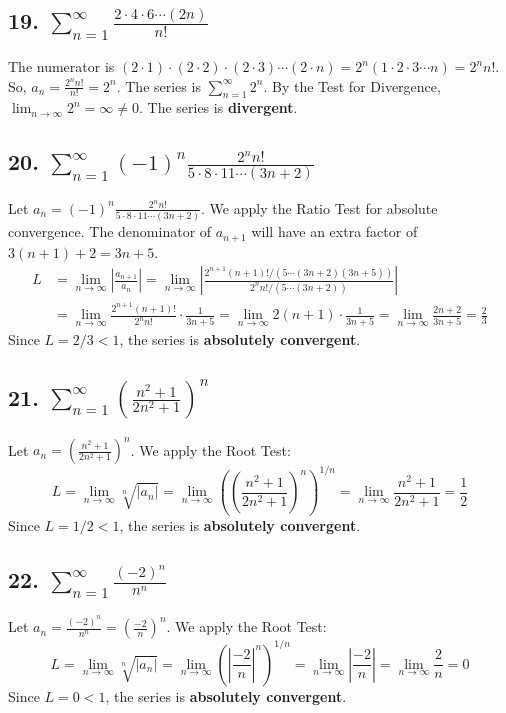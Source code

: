 \documentclass{article}
\begin{document}
\subsection*{19. $\sum_{n=1}^{\infty} \frac{2 \cdot 4 \cdot 6 \cdots (2n)}{n!}$}
The numerator is $(2 \cdot 1) \cdot (2 \cdot 2) \cdot (2 \cdot 3) \cdots (2 \cdot n) = 2^n(1 \cdot 2 \cdot 3 \cdots n) = 2^n n!$.
So, $a_n = \frac{2^n n!}{n!} = 2^n$.
The series is $\sum_{n=1}^{\infty} 2^n$. By the Test for Divergence, $\lim_{n \to \infty} 2^n = \infty \neq 0$.
The series is \textbf{divergent}.

\subsection*{20. $\sum_{n=1}^{\infty} (-1)^n \frac{2^n n!}{5 \cdot 8 \cdot 11 \cdots (3n+2)}$}
Let $a_n = (-1)^n \frac{2^n n!}{5 \cdot 8 \cdot 11 \cdots (3n+2)}$. We apply the Ratio Test for absolute convergence.
The denominator of $a_{n+1}$ will have an extra factor of $3(n+1)+2 = 3n+5$.
\begin{align*}
L &= \lim_{n \to \infty} \left| \frac{a_{n+1}}{a_n} \right| = \lim_{n \to \infty} \left| \frac{2^{n+1}(n+1)!/(5 \cdots (3n+2)(3n+5))}{2^n n!/(5 \cdots (3n+2))} \right| \\
&= \lim_{n \to \infty} \frac{2^{n+1}(n+1)!}{2^n n!} \cdot \frac{1}{3n+5} = \lim_{n \to \infty} 2(n+1) \cdot \frac{1}{3n+5} = \lim_{n \to \infty} \frac{2n+2}{3n+5} = \frac{2}{3}
\end{align*}
Since $L = 2/3 < 1$, the series is \textbf{absolutely convergent}.

\subsection*{21. $\sum_{n=1}^{\infty} \left(\frac{n^2+1}{2n^2+1}\right)^n$}
Let $a_n = \left(\frac{n^2+1}{2n^2+1}\right)^n$. We apply the Root Test:
\[ L = \lim_{n \to \infty} \sqrt[n]{|a_n|} = \lim_{n \to \infty} \left( \left(\frac{n^2+1}{2n^2+1}\right)^n \right)^{1/n} = \lim_{n \to \infty} \frac{n^2+1}{2n^2+1} = \frac{1}{2} \]
Since $L = 1/2 < 1$, the series is \textbf{absolutely convergent}.

\subsection*{22. $\sum_{n=1}^{\infty} \frac{(-2)^n}{n^n}$}
Let $a_n = \frac{(-2)^n}{n^n} = \left(\frac{-2}{n}\right)^n$. We apply the Root Test:
\[ L = \lim_{n \to \infty} \sqrt[n]{|a_n|} = \lim_{n \to \infty} \left( \left|\frac{-2}{n}\right|^n \right)^{1/n} = \lim_{n \to \infty} \left|\frac{-2}{n}\right| = \lim_{n \to \infty} \frac{2}{n} = 0 \]
Since $L = 0 < 1$, the series is \textbf{absolutely convergent}.
\end{document}
